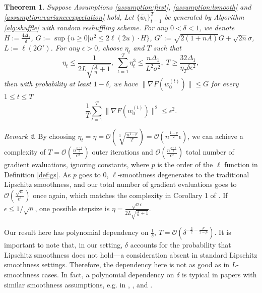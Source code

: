 \documentclass{article} %
\theoremstyle{plain}
\newtheorem{theorem}{Theorem}[section]
\theoremstyle{definition}
\theoremstyle{remark}
\newtheorem{remark}[theorem]{Remark}
\begin{document}
\begin{theorem}
\label{theorem:originalassumption}
    Suppose Assumptions \ref{assumption:first}, \ref{assumption:lsmooth} and \ref{assumption:varianceexpectation} hold, Let $\{\tilde{w_t}\}_{t=1}^T$ be generated by Algorithm \ref{alg:shuffle} with random reshuffling scheme. For any $0<\delta<1$, we denote $H:=\frac{4\Delta_1}{\delta}$, $G:=\sup\{u\geq 0|u^2\leq 2\ell(2u)\cdot H\}$, $G':=\sqrt{2(1+nA)}G+\sqrt{2n}\sigma$, $L:=\ell(2G')$. For any $\epsilon>0$, choose $\eta_t$ and $T$ such that
    $$\eta_t\leq \frac{1}{2L\sqrt{\frac{A}{n}+1}}, \; \sum_{t=1}^T \eta_t^3 \leq \frac{n\Delta_1}{L^2\sigma^2}, \; T\geq \frac{32\Delta_1}{\eta_T \delta\epsilon^2},$$ then with probability at least $1-\delta$, we have $\|\nabla F(w^{(t)}_0)\|\leq G$ for every $1\leq t\leq T$
    $$\frac{1}{T}\sum_{t=1}^T\|\nabla F(w^{(t)}_0)\|^2\leq \epsilon^2.$$
\end{theorem}

\begin{remark}
    By choosing $\eta_t=\eta=\mathcal{O}(\sqrt[3]{\frac{n^{1-p}}{T}})=\mathcal{O}(n^\frac{1-p}{2}\epsilon)$, we can achieve a complexity of $T=\mathcal{O}(\frac{n^\frac{p-1}{2}}{\epsilon^3})$ outer iterations and $\mathcal{O}(\frac{n^\frac{p+1}{2}}{\epsilon^3})$ total number of gradient evaluations, ignoring constants, where $p$ is the order of the $\ell$ function in Definition \ref{def:gs}. 
    As $p$ goes to $0$, $\ell$-smoothness degenerates to the traditional Lipschitz smoothness, and our total number of gradient evaluations goes to $\mathcal{O}(\frac{\sqrt{n}}{\epsilon^3})$ once again, which matches the complexity in Corollary 1 of \citet{nguyen2021unified}. If $\epsilon\leq 1/\sqrt{n}$, one possible stepsize is $\eta=\frac{\sqrt{n}\epsilon}{2L\sqrt{\frac{A}{n}+1}}.$
\end{remark}

Our result here has polynomial dependency on $\frac{1}{\delta}$, $T=\mathcal{O}(\delta^{-\frac{3}{2}-\frac{p}{2-p}})$.
It is important to note that, in our setting, $\delta$ accounts for the probability that Lipschitz smoothness does not hold—a consideration absent in standard Lipschitz smoothness settings. Therefore, the dependency here is not as good as in $L$-smoothness cases. In fact, a polynomial dependency on $\delta$ is typical in papers with similar smoothness assumptions, e.g. in \citet{li2023convex}, \citet{li2023convergence}, \citet{xiandelving} and \citet{zhang2024convergence}. 
\end{document}
